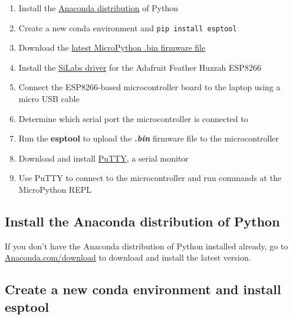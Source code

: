 \documentclass{book}
\providecommand{\tightlist}{%
      \setlength{\itemsep}{0pt}\setlength{\parskip}{0pt}}
\newcommand{\passthrough}[1]{#1}
\begin{document}
    
        \begin{enumerate}
\def\labelenumi{\arabic{enumi}.}
\tightlist
\item
  Install the \href{https://www.anaconda.com/download/}{Anaconda
  distribution} of Python
\item
  Create a new conda environment and
  \passthrough{\lstinline!pip install esptool!}
\item
  Download the \href{http://micropython.org/download\#esp8266}{latest
  MicroPython .bin firmware file}
\item
  Install the
  \href{https://www.silabs.com/products/development-tools/software/usb-to-uart-bridge-vcp-drivers}{SiLabs
  driver} for the Adafruit Feather Huzzah ESP8266
\item
  Connect the ESP8266-based microcontroller board to the laptop using a
  micro USB cable
\item
  Determine which serial port the microcontroller is connected to
\item
  Run the \textbf{esptool} to upload the \textbf{\emph{.bin}} firmware
  file to the microcontroller
\item
  Download and install \href{https://www.putty.org/}{PuTTY}, a serial
  monitor
\item
  Use PuTTY to connect to the microcontroller and run commands at the
  MicroPython REPL
\end{enumerate}
    




    
        \hypertarget{install-the-anaconda-distribution-of-python}{%
\subsection{Install the Anaconda distribution of
Python}\label{install-the-anaconda-distribution-of-python}}
    




    
        If you don't have the Anaconda distribution of Python installed already,
go to \href{https://www.anaconda.com/download/}{Anaconda.com/download}
to download and install the latest version.
    




    
        \hypertarget{create-a-new-conda-environment-and-install-esptool}{%
\subsection{\texorpdfstring{Create a new conda environment and install
\textbf{esptool}}{Create a new conda environment and install esptool}}\label{create-a-new-conda-environment-and-install-esptool}}
    
\end{document}
